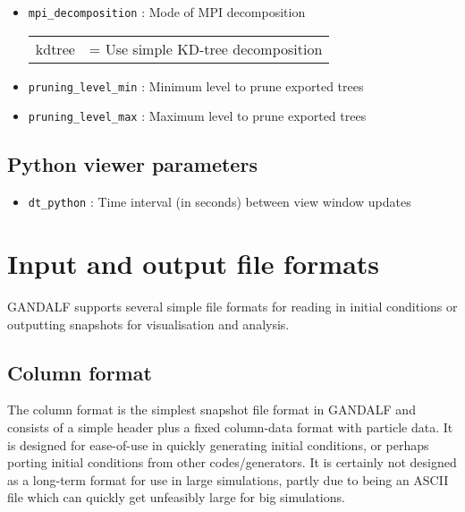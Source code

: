 \documentclass[a4paper]{article}
\newcommand{\var}[1]{\texttt{#1}}
\begin{document}
\begin{itemize}

\item \var{mpi\_decomposition}  : Mode of MPI decomposition \\
\begin{tabular}{ll}
kdtree & = Use simple KD-tree decomposition
\end{tabular}
\item \var{pruning\_level\_min} : Minimum level to prune exported trees
\item \var{pruning\_level\_max} : Maximum level to prune exported trees

\end{itemize}



\subsection{Python viewer parameters}

\begin{itemize}

\item \var{dt\_python} : Time interval (in seconds) between view window updates

\end{itemize}


\newpage



\section{Input and output file formats} \label{S:IO}

GANDALF supports several simple file formats for reading in initial conditions or outputting snapshots for visualisation and analysis.



\subsection{Column format}
The column format is the simplest snapshot file format in GANDALF and consists of a simple header plus a fixed column-data format with particle data.  It is designed for ease-of-use in quickly generating initial conditions, or perhaps porting initial conditions from other codes/generators.  It is certainly not designed as a long-term format for use in large simulations, partly due to being an ASCII file which can quickly get unfeasibly large for big simulations.
\end{document}
